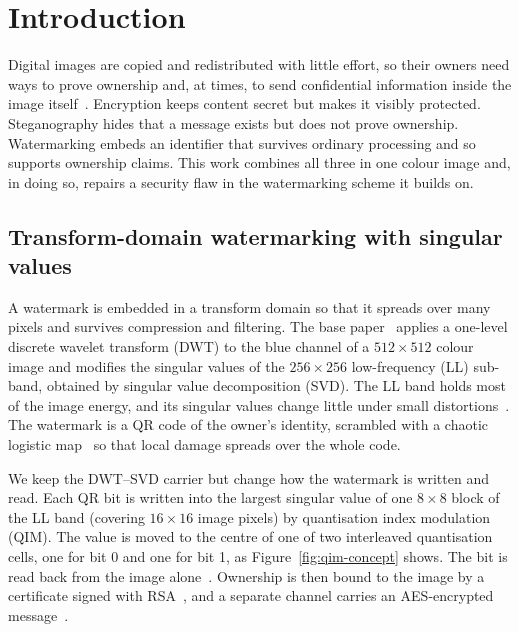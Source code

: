 \documentclass[11pt,a4paper]{article}
\begin{document}
\section{Introduction}\label{sec:intro}

Digital images are copied and redistributed with little effort, so their owners need ways to prove ownership and, at times, to send confidential information inside the image itself~\cite{sanivarapu2022}. Encryption keeps content secret but makes it visibly protected. Steganography hides that a message exists but does not prove ownership. Watermarking embeds an identifier that survives ordinary processing and so supports ownership claims. This work combines all three in one colour image and, in doing so, repairs a security flaw in the watermarking scheme it builds on.

\subsection{Transform-domain watermarking with singular values}\label{sec:intro-core}

A watermark is embedded in a transform domain so that it spreads over many pixels and survives compression and filtering. The base paper~\cite{sanivarapu2022} applies a one-level discrete wavelet transform (DWT) to the blue channel of a $512\times512$ colour image and modifies the singular values of the $256\times256$ low-frequency (LL) sub-band, obtained by singular value decomposition (SVD). The LL band holds most of the image energy, and its singular values change little under small distortions~\cite{liu2002svd}. The watermark is a QR code of the owner's identity, scrambled with a chaotic logistic map~\cite{may1976} so that local damage spreads over the whole code.

We keep the DWT--SVD carrier but change how the watermark is written and read. Each QR bit is written into the largest singular value of one $8\times8$ block of the LL band (covering $16\times16$ image pixels) by quantisation index modulation (QIM). The value is moved to the centre of one of two interleaved quantisation cells, one for bit 0 and one for bit 1, as Figure~\ref{fig:qim-concept} shows. %
The bit is read back from the image alone~\cite{TODO}. Ownership is then bound to the image by a certificate signed with RSA~\cite{rfc8017}, and a separate channel carries an AES-encrypted message~\cite{fips197}.
\end{document}
